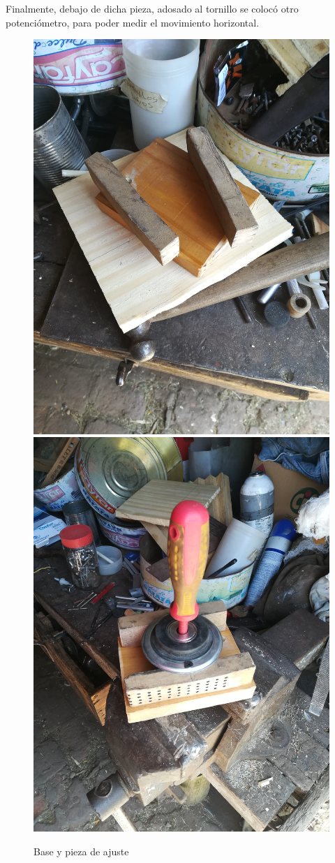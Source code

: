 \documentclass{article}
\begin{document}
Finalmente, debajo de dicha pieza, adosado al tornillo se colocó otro potenciómetro, para poder medir el movimiento horizontal. 

\begin{figure}[H]
\centering
\includegraphics[width=0.4\linewidth]{images/base.jpg}
\includegraphics[width=0.4\linewidth]{images/baseU.jpg}\caption{Base y pieza de ajuste}
\end{figure}
\end{document}
